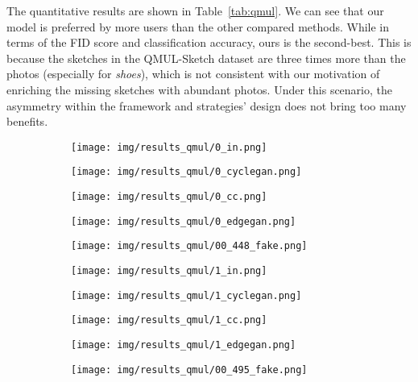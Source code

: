 \documentclass[10pt,twocolumn,letterpaper]{article}
\begin{document}
The quantitative results are shown in Table~\ref{tab:qmul}. We can see that our model is preferred by more users than the other compared methods. While in terms of the FID score and classification accuracy, ours is the second-best. This is because the sketches in the QMUL-Sketch dataset are three times more than the photos (especially for \textit{shoes}), which is not consistent with our motivation of enriching the missing sketches with abundant photos. Under this scenario, the asymmetry within the framework and strategies' design does not bring too many benefits. 

\newcommand{\qmulwidth}{0.18} 
\begin{figure}[htbp]
\captionsetup[subfigure]{labelformat=empty}
\begin{center}
  \begin{subfigure}[b]{\qmulwidth\linewidth}
  \texttt{[image: img/results\_qmul/0\_in.png]}
  \end{subfigure}
  \begin{subfigure}[b]{\qmulwidth\linewidth}
  \texttt{[image: img/results\_qmul/0\_cyclegan.png]}
  \end{subfigure}
  \begin{subfigure}[b]{\qmulwidth\linewidth}
  \texttt{[image: img/results\_qmul/0\_cc.png]}
  \end{subfigure}
   \begin{subfigure}[b]{\qmulwidth\linewidth}
  \texttt{[image: img/results\_qmul/0\_edgegan.png]}
  \end{subfigure}
  \begin{subfigure}[b]{\qmulwidth\linewidth}
  \texttt{[image: img/results\_qmul/00\_448\_fake.png]}
  \end{subfigure}
  
\begin{subfigure}[b]{\qmulwidth\linewidth}
  \texttt{[image: img/results\_qmul/1\_in.png]}
  \end{subfigure}
  \begin{subfigure}[b]{\qmulwidth\linewidth}
  \texttt{[image: img/results\_qmul/1\_cyclegan.png]}
  \end{subfigure}
  \begin{subfigure}[b]{\qmulwidth\linewidth}
  \texttt{[image: img/results\_qmul/1\_cc.png]}
  \end{subfigure} 
   \begin{subfigure}[b]{\qmulwidth\linewidth}
  \texttt{[image: img/results\_qmul/1\_edgegan.png]}
  \end{subfigure}
  \begin{subfigure}[b]{\qmulwidth\linewidth}
  \texttt{[image: img/results\_qmul/00\_495\_fake.png]}
  \end{subfigure}
  

\end{center}
\end{figure}
\end{document}
